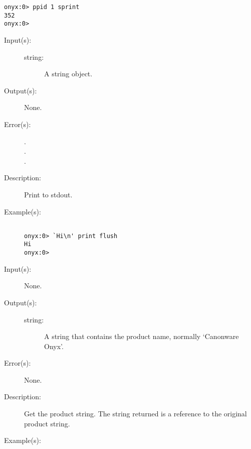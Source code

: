 \begin{description}
\begin{description}
\begin{verbatim}
onyx:0> ppid 1 sprint
352
onyx:0>
		\end{verbatim}
	\end{description}
\label{systemdict:print}
\item[{\onyxop{string}{print}{--}}: ]
	\begin{description}\item[]
	\item[Input(s): ]
		\begin{description}\item[]
		\item[string: ]
			A string object.
		\end{description}
	\item[Output(s): ] None.
	\item[Error(s): ]
		\begin{description}\item[]
		\item[.]
		\item[.]
		\item[.]
		\end{description}
	\item[Description: ]
		Print  to stdout.
	\item[Example(s): ]\begin{verbatim}

onyx:0> `Hi\n' print flush
Hi
onyx:0>
		\end{verbatim}
	\end{description}
\label{systemdict:product}
\item[{\onyxop{--}{product}{string}}: ]
	\begin{description}\item[]
	\item[Input(s): ] None.
	\item[Output(s): ]
		\begin{description}\item[]
		\item[string: ]
			A string that contains the product name, normally
			`Canonware Onyx'.
		\end{description}
	\item[Error(s): ] None.
	\item[Description: ]
		Get the product string.  The string returned is a reference to
		the original product string.
	\item[Example(s): ]\begin{verbatim}


\end{verbatim}
\end{description}
\end{description}
